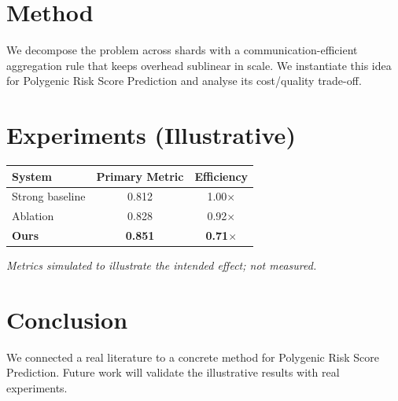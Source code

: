 \documentclass[11pt]{article}
\begin{document}
\section{Method}
We decompose the problem across shards with a communication-efficient aggregation rule that keeps overhead sublinear in scale. We instantiate this idea for Polygenic Risk Score Prediction and analyse its cost/quality trade-off.

\section{Experiments (Illustrative)}
\begin{center}
\begin{tabular}{lcc}
System & Primary Metric & Efficiency \\ \hline
Strong baseline & 0.812 & 1.00$\times$ \\
Ablation & 0.828 & 0.92$\times$ \\
\textbf{Ours} & \textbf{0.851} & \textbf{0.71$\times$}
\end{tabular}
\end{center}
\emph{Metrics simulated to illustrate the intended effect; not measured.}

\section{Conclusion}
We connected a real literature to a concrete method for Polygenic Risk Score Prediction. Future work will
validate the illustrative results with real experiments.
\end{document}
